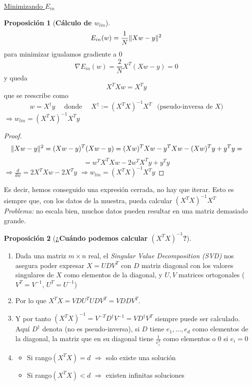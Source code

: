 \documentclass[11pt,a4paper]{article}
\DeclarePairedDelimiter{\norm}{\lVert}{\rVert}
\theoremstyle{definition}
\newtheorem{proposition}{Proposición}[section]
\begin{document}
	\underline{Minimizando $E_{in}$}
	\begin{proposition}[\textbf{Cálculo de $w_{lin}$}]
	$$E_{in}(w)=\frac{1}{N}\norm{Xw-y}^2$$
	para minimizar igualamos gradiente a 0
	$$\nabla E_{in}(w)=\frac{2}{N} X^T (Xw-y)=0$$
	y queda
	$$X^TXw= X^Ty$$
	que se reescribe como
	$$w=X^\dagger y \quad \text{ donde } \quad X^\dagger :=(X^TX)^{-1}X^T \ \ \text{ (pseudo-inversa de } X\text{)}$$
	$\Rightarrow w_{lin}=(X^TX)^{-1}X^Ty$
	\begin{proof}
	$$\norm{Xw-y}^2=(Xw-y)^T(Xw-y)=(Xw)^TXw-y^TXw-(Xw)^Ty+y^Ty=$$
	$$=w^TX^TXw-2w^TX^Ty+y^Ty$$
	$\Rightarrow \frac{d}{dw}=2X^TXw-2X^Ty$ $\Rightarrow w_{lin}=(X^TX)^{-1}X^Ty$
	\end{proof}
	
	\end{proposition}
	
	Es decir, hemos conseguido una expresión cerrada, no hay que iterar. Esto es siempre que, con los datos de la muestra, pueda calcular $(X^TX)^{-1}X^T$\\
	
	\textit{Problema:} no escala bien, muchos datos pueden resultar en una matriz demasiado grande.\\
	
	\begin{proposition}[\textbf{¿Cuándo podemos calcular $(X^TX)^{-1}$?}] $\ $
	\begin{enumerate}
	\item Dada una matriz $m\times n$ real, el \textit{Singular Value Decomposition (SVD)} nos asegura poder expresar $X=UDV^T$ con $D$ matriz diagonal con los valores singulares de $X$ como elementos de la diagonal, y $U,V$ matrices ortogonales ($V^T=V^{-1}$, $U^T=U^{-1}$)
	
	\item Por lo que $X^TX=VDU^TUDV^T=VDDV^T$. 
	\item Y por tanto $(X^TX)^{-1}=V^{-T}D^\dagger V^{-1}=VD^\dagger V^T$ siempre puede ser calculado. Aquí $D^\dagger$ denota (no es pseudo-inversa), si $D$ tiene $e_1,\ldots,e_d$ como elementos de la diagonal, la matriz que en su diagonal tiene $\frac{1}{e_i^2}$ como elementos o $0$ si $e_i=0$
	\item 
	\begin{itemize}
		\item Si rango$(X^TX)=d$ $\Rightarrow$ solo existe una solución
		\item Si rango$(X^TX)<d$ $\Rightarrow$ existen infinitas soluciones
	\end{itemize}
	\end{enumerate}
	\end{proposition}
	
\end{document}

